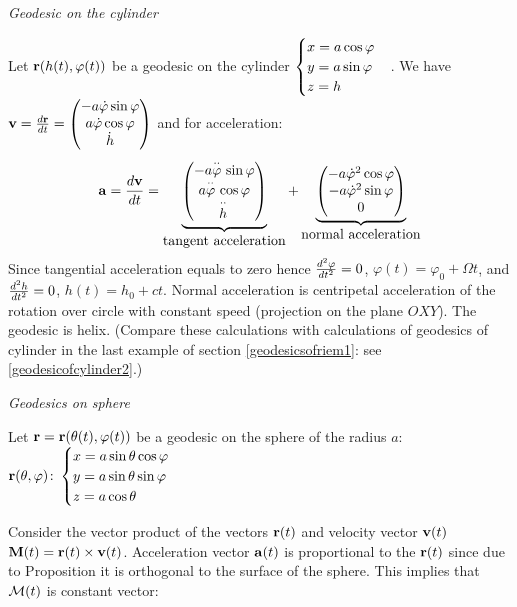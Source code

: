 \documentclass[12pt]{article}
\theoremstyle{theorem}
\numberwithin{equation}{section}
\begin{document}
{\it Geodesic on the cylinder}

Let ${\bf r}(h(t),\varphi(t))$ be a geodesic on the cylinder $\begin{cases}x=a\cos\varphi\cr y=a\sin\varphi \cr z=h\cr
\end{cases}$.
    We have  ${\bf v}={d{\bf r}\over dt}=\begin{pmatrix}-a\dot \varphi\sin\varphi\cr a\dot
    \varphi\cos\varphi\cr \dot h\end{pmatrix}$
and for acceleration:
                       \begin{equation*}\label{}
    \ac={d\v\over dt}= \underbrace
              {
    \begin{pmatrix}-a{\buildrel \cdot\cdot\over \varphi\,}\sin\varphi\cr
    a{\buildrel \cdot\cdot\over \varphi\,}\cos\varphi\cr
    {\buildrel \cdot\cdot\over h\,}\cr
    \end{pmatrix}
         }_{\hbox {tangent acceleration}}+
         \underbrace
            {
    \begin{pmatrix}-a\dot \varphi^2\cos\varphi\cr
     -a\dot\varphi^2\sin\varphi\cr
         0\cr\end{pmatrix}
    }_{\hbox {normal acceleration}}
\end{equation*}
Since tangential acceleration equals to zero hence
 ${d^2\varphi\over dt^2}=0$, $\varphi(t)=\varphi_0+\Omega t$, and
 ${d^2h\over dt^2}=0$, $h(t)=h_0+ct$.
Normal acceleration is centripetal acceleration of the rotation over circle with constant speed
(projection on the plane $OXY$). The geodesic is helix.
(Compare these calculations with calculations of geodesics of cylinder in the last example of
section \ref{geodesicsofriem1}: see \eqref{geodesicofcylinder2}.)

\m

 \centerline  {\it Geodesics on sphere}

\smallskip

\noindent Let ${\bf r}={\bf r}(\theta(t),\varphi(t))$ be a geodesic on the sphere  of the radius $a$:
${\bf r}(\theta,\varphi)\colon \begin{cases}x=a\sin\theta\cos\varphi\cr y=a\sin\theta\sin\varphi \cr z=a\cos\theta\cr
\end{cases}$


Consider the vector product of the vectors ${\bf r}(t)$ and velocity vector ${\bf v}(t)$
${\bf M}(t)={\bf r}(t)\times {\bf v}(t)$.
Acceleration vector ${\bf a}(t)$ is proportional to the ${\bf r}(t)$
since due to Proposition it is orthogonal to the surface of the sphere. This implies that
${\cal M}(t)$ is constant vector:
\end{document}
